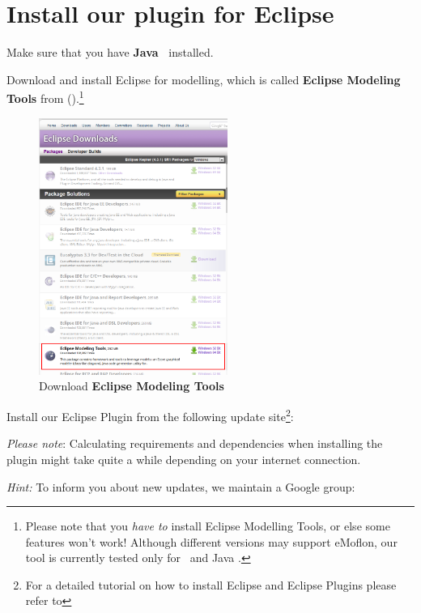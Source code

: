 \genHeader
\hypertarget{installPlugin common}{} 
\section{Install our plugin for Eclipse}
 
\vspace{0.5cm}
 
\begin{stepbystep}

\item  Make sure that you have \textbf{Java~\JavaVersion{}} installed.
 
\item  Download and install Eclipse \EclipseVersion for modelling, which is called \textbf{Eclipse Modeling Tools} from \EclipseDownloadLink ().\footnote{Please
note that you \emph{have to} install Eclipse Modelling Tools, or else some features won't work! Although different versions may support eMoflon, our tool is
currently tested only for \EclipseVersion~and Java \JavaVersion.} 

\begin{figure}[htbp]
	\centering
  	\includegraphics[width=0.55\textwidth]{../../org.moflon.doc.handbook.01_installation/1_installation/installPlugin/eclipseDownloadPage.png}
	\caption{Download \textbf{Eclipse Modeling Tools}}
	\label{eclipseDownload}
\end{figure}

\vspace{0.9cm}

\item  Install our Eclipse Plugin from the following update site\footnote{For a detailed tutorial on how to install Eclipse and Eclipse
Plugins please refer to }:\\ \eMoflonUpdateSite

\emph{Please note}: Calculating requirements and dependencies when
installing the plugin might take quite a while depending on your internet connection.

\emph{Hint:} To inform you about new updates, we maintain a Google group: 
\end{stepbystep}
